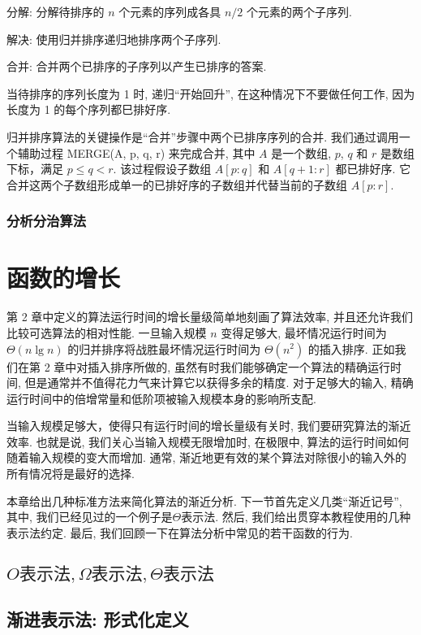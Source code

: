 \documentclass[oneside,10pt,fontset=none]{ctexbook}
\numberwithin{definition}{chapter}
\numberwithin{theorem}{chapter}
\numberwithin{proof}{chapter}
\begin{document}
分解: 分解待排序的 $n$ 个元素的序列成各具 $n/2$ 个元素的两个子序列.

解决: 使用归并排序递归地排序两个子序列.

合并: 合并两个已排序的子序列以产生已排序的答案.

当待排序的序列长度为 1 时, 递归``开始回升'', 在这种情况下不要做任何工作, 因为长度为 1 的每个序列都巳排好序.

归并排序算法的关键操作是``合并''步骤中两个已排序序列的合并. 我们通过调用一个辅助过程 MERGE(A, p, q, r) 来完成合并, 其中 $A$ 是一个数组, $p$, $q$ 和 $r$ 是数组下标，满足 $p\leq q<r$. 该过程假设子数组 $A[p:q]$ 和 $A[q+1:r]$ 都已排好序. 它合并这两个子数组形成单一的已排好序的子数组并代替当前的子数组 $A[p:r]$.

\subsection{分析分治算法}

\chapter{函数的增长}

第 2 章中定义的算法运行时间的增长量级简单地刻画了算法效率, 并且还允许我们比较可选算法的相对性能. 一旦输入规模 $n$ 变得足够大, 最坏情况运行时间为 $\Theta(n\lg{n})$ 的归并排序将战胜最坏情况运行时间为 $\Theta(n^2)$ 的插入排序. 正如我们在第 2 章中对插入排序所做的, 虽然有时我们能够确定一个算法的精确运行时间, 但是通常并不值得花力气来计算它以获得多余的精度. 对于足够大的输入, 精确运行时间中的倍增常量和低阶项被输入规模本身的影响所支配.

当输入规模足够大，使得只有运行时间的增长量级有关时, 我们要研究算法的渐近效率. 也就是说, 我们关心当输入规模无限增加时, 在极限中, 算法的运行时间如何随着输入规模的变大而增加. 通常, 渐近地更有效的某个算法对除很小的输入外的所有情况将是最好的选择.

本章给出几种标准方法来简化算法的渐近分析. 下一节首先定义几类``渐近记号'', 其中, 我们已经见过的一个例子是$\Theta$表示法. 然后, 我们给出贯穿本教程使用的几种表示法约定. 最后, 我们回顾一下在算法分析中常见的若干函数的行为.

\section{\texorpdfstring{$O\text{表示法},\Omega\text{表示法},\Theta\text{表示法}$}{Lg}}




\section{渐进表示法: 形式化定义}
\end{document}
